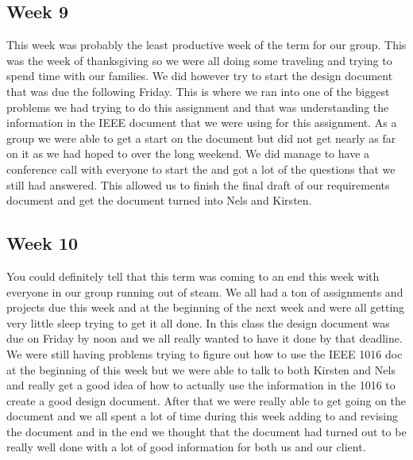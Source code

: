 \documentclass[10pt,draftclsnofoot,onecolumn]{IEEEtran}
\begin{document}
\subsection{Week 9}
This week was probably the least productive week of the term for our group. This was the week of thanksgiving so we were all doing some traveling and trying to spend time with our families. We did however try to start the design document that was due the following Friday. This is where we ran into one of the biggest problems we had trying to do this assignment and that was understanding the information in the IEEE document that we were using for this assignment. As a group we were able to get a start on the document but did not get nearly as far on it as we had hoped to over the long weekend. We did manage to have a conference call with everyone to start the and got a lot of the questions that we still had answered. This allowed us to finish the final draft of our requirements document and get the document turned into Nels and Kirsten.  

\subsection{Week 10}
You could definitely tell that this term was coming to an end this week with everyone in our group running out of steam. We all had a ton of assignments and projects due this week and at the beginning of the next week and were all getting very little sleep trying to get it all done. In this class the design document was due on Friday by noon and we all really wanted to have it done by that deadline. We were still having problems trying to figure out how to use the IEEE 1016 doc at the beginning  of this week but we were able to talk to both Kirsten and Nels and really get a good idea of how to actually use the information in the 1016 to create a good design document. After that we were really able to get going on the document and we all spent a lot of time during this week adding to and revising the document and in the end we thought that the document had turned out to be really well done with a lot of good information for both us and our client. 

\end{document}
